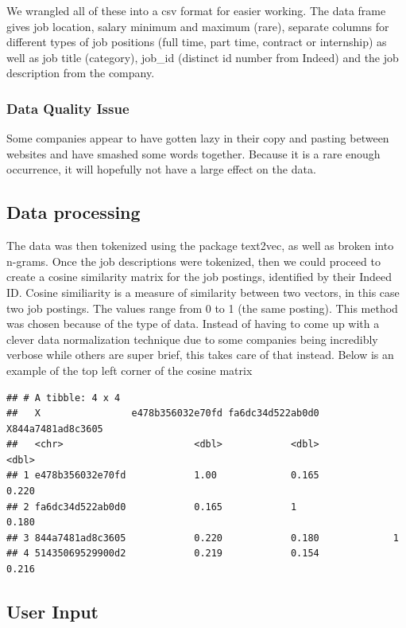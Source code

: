 \documentclass[
]{article}
\begin{document}
We wrangled all of these into a csv format for easier working. The data
frame gives job location, salary minimum and maximum (rare), separate
columns for different types of job positions (full time, part time,
contract or internship) as well as job title (category), job\_id
(distinct id number from Indeed) and the job description from the
company.

\hypertarget{data-quality-issue}{%
\subsubsection{Data Quality Issue}\label{data-quality-issue}}

Some companies appear to have gotten lazy in their copy and pasting
between websites and have smashed some words together. Because it is a
rare enough occurrence, it will hopefully not have a large effect on the
data.

\hypertarget{data-processing}{%
\subsection{Data processing}\label{data-processing}}

The data was then tokenized using the package text2vec, as well as
broken into n-grams. Once the job descriptions were tokenized, then we
could proceed to create a cosine similarity matrix for the job postings,
identified by their Indeed ID. Cosine similiarity is a measure of
similarity between two vectors, in this case two job postings. The
values range from 0 to 1 (the same posting). This method was chosen
because of the type of data. Instead of having to come up with a clever
data normalization technique due to some companies being incredibly
verbose while others are super brief, this takes care of that instead.
Below is an example of the top left corner of the cosine matrix

\begin{verbatim}
## # A tibble: 4 x 4
##   X                e478b356032e70fd fa6dc34d522ab0d0 X844a7481ad8c3605
##   <chr>                       <dbl>            <dbl>             <dbl>
## 1 e478b356032e70fd            1.00             0.165             0.220
## 2 fa6dc34d522ab0d0            0.165            1                 0.180
## 3 844a7481ad8c3605            0.220            0.180             1    
## 4 51435069529900d2            0.219            0.154             0.216
\end{verbatim}

\hypertarget{user-input}{%
\subsection{User Input}\label{user-input}}
\end{document}
